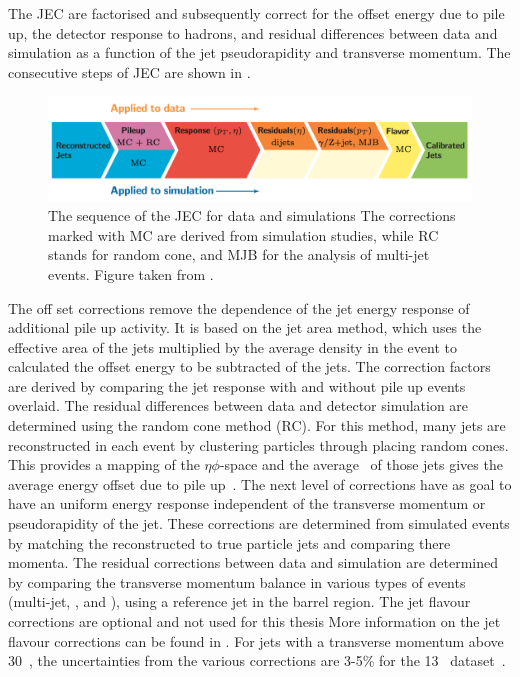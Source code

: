 The JEC are factorised and subsequently correct for the offset energy due to pile up, the detector response to hadrons, and residual differences between data and simulation as a function of the jet pseudorapidity and transverse momentum.  The consecutive steps of JEC are shown in . 
\begin{figure}[htbp]
	\centering
	\includegraphics[width=1.\linewidth]{4_EventRecoSelect/Figures/JES}
	\caption{The sequence of the JEC for data and simulations The corrections marked with MC are derived from simulation studies, while RC stands for random cone, and MJB for the analysis of multi-jet events. Figure taken from \cite{1748-0221-12-02-P02014}.}
	\label{fig:jes}
\end{figure}
The off set corrections remove the dependence of the jet energy response of additional pile up activity. It is based on the jet area method, which uses the effective area of the jets multiplied by the average density in the event to calculated the offset energy to be subtracted of the jets.  The correction factors are derived by comparing the jet response with and without pile up events overlaid. The residual differences between data and detector simulation are determined using the random cone method (RC). For this method, many jets are reconstructed in each event by clustering particles through placing  random cones. This provides a mapping of the $\eta\phi$-space and the average \pt\ of those jets gives the average energy offset due to pile up~\cite{1748-0221-12-02-P02014}. 
The next level of corrections have as goal to have an uniform energy response independent of the transverse momentum or pseudorapidity of the jet.  These corrections are determined from simulated events by matching the reconstructed to true particle jets and comparing there momenta. 
The residual corrections between data and simulation are determined by comparing the transverse momentum balance in various types of events (multi-jet, \Zjets, and \pjets), using a reference jet in the barrel region.  
The jet flavour corrections are optional and not used for this thesis More information on the jet flavour corrections can be found in \cite{1748-0221-12-02-P02014}. For jets with a transverse momentum above 30~\GeV, the uncertainties from the various corrections are 3-5\% for the 13 \TeV\ dataset~\cite{CMS-DP-2016-020}.


